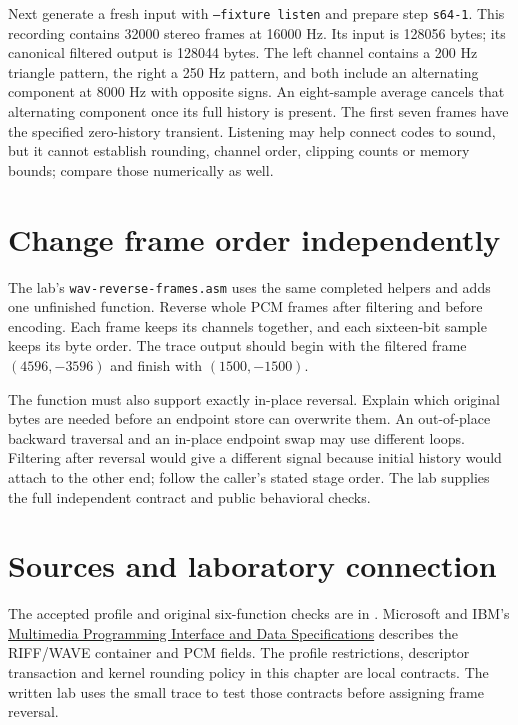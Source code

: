 Next generate a fresh input with \texttt{--fixture listen} and prepare step
\texttt{s64-1}. This recording contains 32000 stereo frames at 16000 Hz.
Its input is 128056 bytes; its canonical filtered output is 128044 bytes.
The left channel contains a 200 Hz triangle pattern, the right a 250 Hz pattern,
and both include an alternating component at 8000 Hz with opposite signs.
An eight-sample average cancels that alternating component once its full
history is present. The first seven frames have the specified zero-history
transient. Listening may help connect codes to sound, but it cannot establish
rounding, channel order, clipping counts or memory bounds; compare those
numerically as well.

\section{Change frame order independently}

The lab's \texttt{wav-reverse-frames.asm} uses the same completed helpers and
adds one unfinished function. Reverse whole PCM frames after filtering and
before encoding. Each frame keeps its channels together, and each sixteen-bit
sample keeps its byte order. The trace output should begin with the filtered
frame $(4596,-3596)$ and finish with $(1500,-1500)$.

The function must also support exactly in-place reversal. Explain which original
bytes are needed before an endpoint store can overwrite them. An out-of-place
backward traversal and an in-place endpoint swap may use different loops.
Filtering after reversal would give a different signal because initial history
would attach to the other end; follow the caller's stated stage order.
The lab supplies the full independent contract and public behavioral checks.

\section*{Sources and laboratory connection}
The accepted profile and original six-function checks are in
. Microsoft and IBM's
\href{https://www.mmsp.ece.mcgill.ca/Documents/AudioFormats/WAVE/Docs/riffmci.pdf}{Multimedia
  Programming Interface and Data Specifications} describes the RIFF/WAVE
container and PCM fields. The profile restrictions, descriptor transaction and
kernel rounding policy in this chapter are local contracts. The written lab
uses the small trace to test those contracts before assigning frame reversal.
